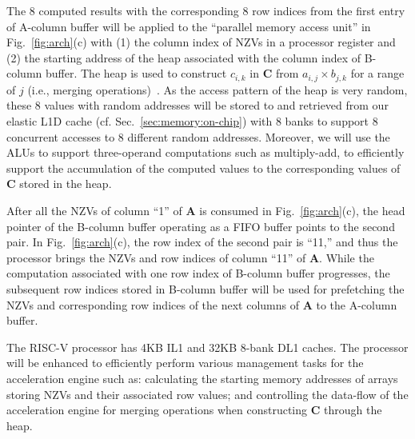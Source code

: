 

The 8 computed results with the corresponding 8 row indices from the first entry of A-column buffer will be applied to 
the ``parallel memory access unit'' in Fig.~\ref{fig:arch}(c) with 
(1) the column index of NZVs in a processor register and (2) the starting address of the heap associated with the column index of B-column buffer.
The heap is used to construct $c_{i,k}$ in \textbf{C} from $a_{i,j} \times b_{j,k}$ for a range of $j$ (i.e., merging operations)~\cite{buluc:ipdps:2015}. 
As the access pattern of the heap is very random, these 8 values with random addresses will be stored to and retrieved from our elastic L1D cache (cf. Sec.~\ref{sec:memory:on-chip}) with 8 banks to support 8 concurrent accesses to 8 different random addresses.
Moreover, we will use the ALUs to support three-operand computations such as multiply-add, to efficiently support the accumulation of 
the computed values to the corresponding values of \textbf{C} stored in the heap.


After all the NZVs of column ``1'' of \textbf{A} is consumed in Fig.~\ref{fig:arch}(c), 
the head pointer of the B-column buffer operating as a FIFO buffer points to the second pair.
In Fig.~\ref{fig:arch}(c), the row index of the second pair is ``11,'' 
and thus the processor brings the NZVs and row indices of column ``11'' of \textbf{A}. 
While the computation associated with one row index of B-column buffer progresses, 
the subsequent row indices stored in B-column buffer will be used for prefetching the NZVs and corresponding row indices of the next columns of \textbf{A} to the A-column buffer.


The RISC-V processor has 4KB IL1 and 32KB 8-bank DL1 caches.
The processor will be enhanced to efficiently perform various management tasks for the acceleration engine such as:
calculating the starting memory addresses of arrays storing NZVs 
and their associated row values; and
controlling the data-flow of the acceleration engine for merging operations when constructing \textbf{C} through the heap.
 

